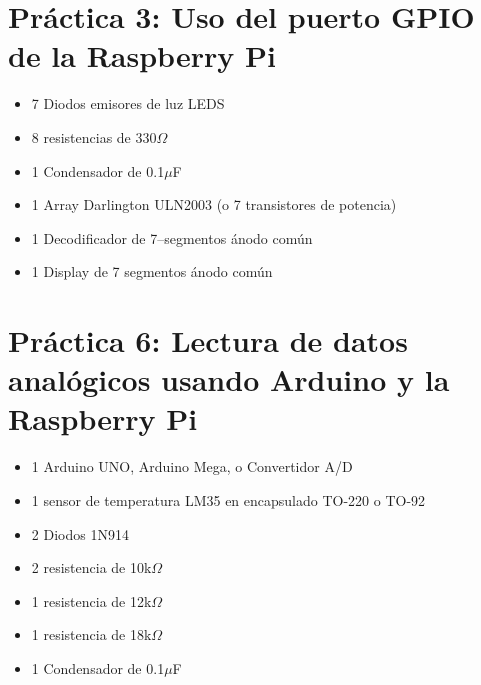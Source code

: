\documentclass[letterpaper,10.5pt]{article}
\begin{document}
\section{Práctica 3: Uso del puerto GPIO de la Raspberry Pi} %
\begin{itemize}[noitemsep]
	\item 7 Diodos emisores de luz LEDS
	\item 8 resistencias de 330$\Omega$
	\item 1 Condensador de 0.1$\mu$F
	\item 1 Array Darlington ULN2003 (o 7 transistores de potencia)
	\item 1 Decodificador de 7--segmentos ánodo común
	\item 1 Display de 7 segmentos ánodo común
\end{itemize}



\section{Práctica 6: Lectura de datos analógicos usando Arduino y la Raspberry Pi} %
\begin{itemize}[noitemsep]
	\item 1 Arduino UNO, Arduino Mega, o Convertidor A/D \IIC{}
	\item 1 sensor de temperatura LM35 en encapsulado TO-220 o TO-92
	\item 2 Diodos 1N914
	\item 2 resistencia de 10k$\Omega$
	\item 1 resistencia de 12k$\Omega$\footnotemark
	\item 1 resistencia de 18k$\Omega$
	\item 1 Condensador de 0.1$\mu$F
\end{itemize}
\end{document}

